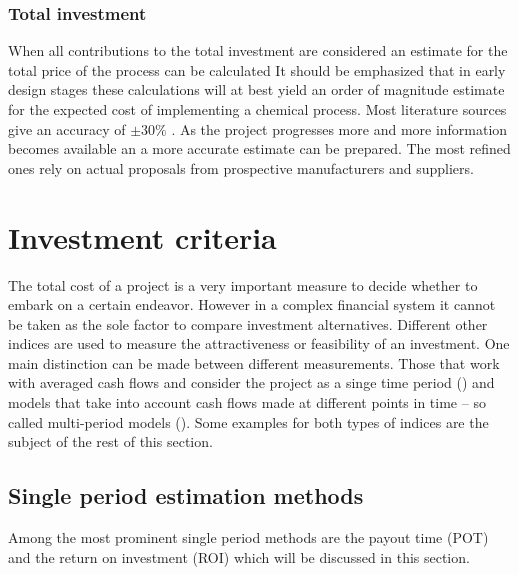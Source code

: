     \subsubsection{Total investment}
        When all contributions to the total investment are considered an estimate for the total price of the
        process can be calculated
        It should be emphasized that in early design stages these calculations will at best yield an order of
        magnitude estimate for the expected cost of implementing a chemical process. Most literature sources
        give an accuracy of $\pm 30 \%$  \cite{Peters.2003}. As the project progresses more and more information
        becomes available an a more accurate estimate can be prepared. The most refined ones rely on actual
        proposals from prospective manufacturers and suppliers.


\section{Investment criteria}
\label{sec:InvestmentCriteria}
    The total cost of a project is a very important measure to decide whether to embark on a certain endeavor.
    However in a complex financial system it cannot be taken as the sole factor to compare investment
    alternatives. Different other indices are used to measure the attractiveness or feasibility of an investment. One
    main distinction can be made between different measurements. Those that work with averaged cash flows
    and consider the project as a singe time period () and models that take into
    account cash flows made at different points in time -- so called multi-period models ().
    Some examples for both types of indices are the subject of the rest of this section.


    \subsection{Single period estimation methods}
    \label{sec:SinglePeriod}
        Among the most prominent single period methods are the payout time (POT) and the return on
        investment (ROI) which will be discussed in this section.


